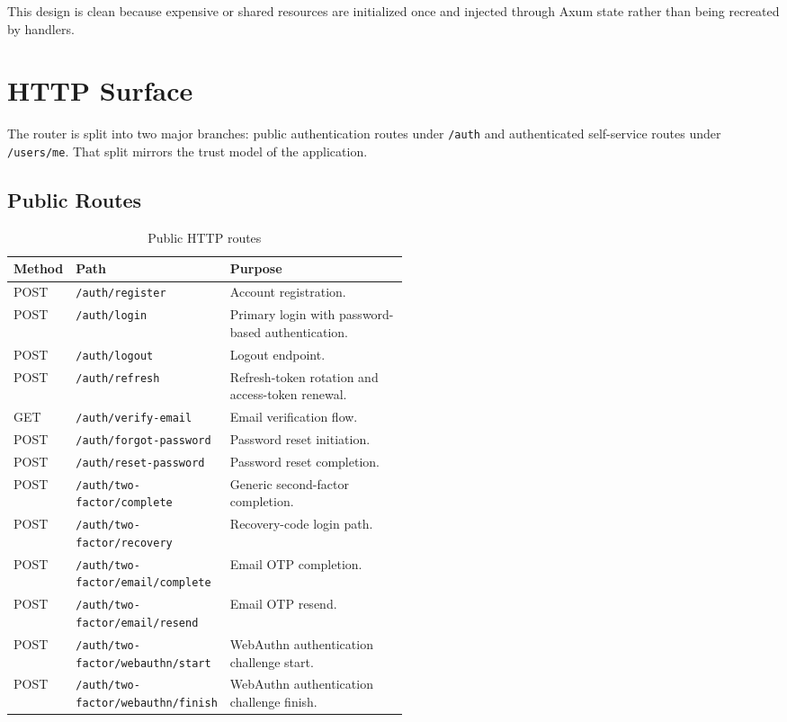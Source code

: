 \documentclass[11pt,a4paper]{article}
\newcommand{\route}[1]{\nolinkurl{#1}}
\begin{document}
This design is clean because expensive or shared resources are initialized once and injected through Axum state rather than being recreated by handlers.

\section{HTTP Surface}

The router is split into two major branches: public authentication routes under \texttt{/auth} and authenticated self-service routes under \texttt{/users/me}. That split mirrors the trust model of the application.

\subsection{Public Routes}

\begin{table}[H]
\centering
\scriptsize
\caption{Public HTTP routes}
\begin{tabularx}{\linewidth}{T{0.12\linewidth} T{0.39\linewidth} Y}
\toprule
Method & Path & Purpose \\
\midrule
POST & \route{/auth/register} & Account registration. \\
POST & \route{/auth/login} & Primary login with password-based authentication. \\
POST & \route{/auth/logout} & Logout endpoint. \\
POST & \route{/auth/refresh} & Refresh-token rotation and access-token renewal. \\
GET & \route{/auth/verify-email} & Email verification flow. \\
POST & \route{/auth/forgot-password} & Password reset initiation. \\
POST & \route{/auth/reset-password} & Password reset completion. \\
POST & \route{/auth/two-factor/complete} & Generic second-factor completion. \\
POST & \route{/auth/two-factor/recovery} & Recovery-code login path. \\
POST & \route{/auth/two-factor/email/complete} & Email OTP completion. \\
POST & \route{/auth/two-factor/email/resend} & Email OTP resend. \\
POST & \route{/auth/two-factor/webauthn/start} & WebAuthn authentication challenge start. \\
POST & \route{/auth/two-factor/webauthn/finish} & WebAuthn authentication challenge finish. \\
\bottomrule
\end{tabularx}
\end{table}
\end{document}
